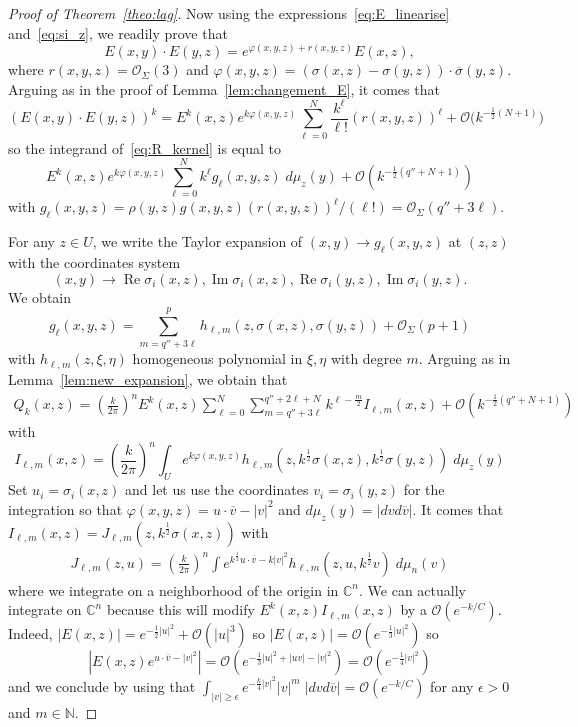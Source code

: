 \documentclass[10pt,a4paper]{article}
\theoremstyle{definition}
\numberwithin{equation}{section}
\newcommand{\N}{{\mathbb{N}}}
\newcommand{\C}{{\mathbb{C}}}
\newcommand{\si}{{\sigma}}
\newcommand{\Si}{{\Sigma}}
\newcommand{\ep}{\epsilon}
\newcommand{\con}{\overline}
\newcommand{\op}{\operatorname}
\newcommand{\bigo}{\mathcal{O}}
\begin{document}
\begin{proof}[Proof of Theorem~\ref{theo:lag}]
Now using the expressions~\eqref{eq:E_linearise} and~\eqref{eq:si_z}, we readily prove that
\[
E(x,y) \cdot E(y,z) = e^{ \varphi (x,y,z) + r(x,y,z) } E
(x,z),
\]
where $r(x,y,z) = \bigo_{\Si} (3)$ and $ \varphi(x,y,z) = (\si (x,z) - \si (y,z))\cdot \con{\si} (y,z) $. Arguing as in the proof of Lemma~\ref{lem:changement_E}, it comes that
\[
(E(x,y) \cdot E(y,z))^k = E^k(x,z) e^{k \varphi (x,y,z)} \sum_{\ell =0 }^{N}
\frac{k^{\ell}}{\ell !} (r (x,y,z))^{\ell} + \bigo \bigl(k^{-\frac{1}{2} (N+1) } \bigr)
\]
so the integrand of~\eqref{eq:R_kernel} is equal to
\[
E^k(x,z) e^{k \varphi (x,y,z)} \sum_{\ell =0 }^{N}
k^{\ell} g_{\ell} (x,y,z) \; d\mu_z (y) + \bigo \left(k^{-\frac{1}{2} (q'' + N+1)} \right)
\]
with $g_{\ell} (x,y,z) = \rho(y,z) g (x,y,z) (r (x,y,z)) ^\ell / (\ell !) = \bigo_{\Si} (q''+ 3\ell)$.

For any $z \in U$, we write the Taylor expansion of $(x,y) \rightarrow g_{\ell}(x, y,z)$ at $(z,z)$ with the coordinates system
\[
(x,y) \rightarrow \op{Re} \si_i (x,z), \op{Im} \si_i (x,z),
\op{Re} \si_i (y,z), \op{Im} \si_i (y,z).
\]
We obtain
\[
g_\ell(x,y,z) = \sum_{m= q'' + 3 \ell}^{p} h_{\ell,m} (z, \si (x,z), \si (y,z))
+ \bigo_{\Si} (p+1)
\]
with $h_{\ell,m} (z, \xi, \eta)$ homogeneous polynomial in $\xi, \eta$ with degree $m$. Arguing as in Lemma~\ref{lem:new_expansion}, we obtain that
\begin{gather}\label{eq:dev_loc_R}
Q_k (x,z) = \left(\frac{k}{2\pi} \right)^n E^k(x,z) \sum_{\ell= 0}^{N}
\sum_{m= q''+ 3 \ell}^{q''+ 2 \ell +N} k^{\ell - \frac{m}{2}} I_{\ell,m} (x,z) + \bigo \left(k^{-\frac{1}{2} \left(q'' + N+1\right)} \right)
\end{gather}
with
\[
I_{\ell,m} (x,z) = \left(\frac{k}{2\pi} \right)^n \int_U e^{k
\varphi (x,y,z) } h_{\ell,m} \left(z, k^{\frac{1}{2}} \si (x,z), k^{\frac{1}{2}}
\si (y,z)\right) \; d\mu_z (y)
\]
Set $u_i = \si_i (x,z)$ and let us use the coordinates $v_i = \si_i (y,z)$ for the integration so that $\varphi (x,y,z) = u \cdot \con v - |v|^2$ and $d\mu_z (y) = |dv d \con{v}|$. It comes that $ I_{\ell, m} (x,z) = J_{\ell, m} (z, k^{\frac{1}{2}} \si (x,z))$ with
\begin{gather}\label{eq:j_ell_m}
J_{\ell, m } (z, u) = \left(\frac{k}{2\pi} \right)^n \int e^{ k^{\frac{1}{2}} u \cdot \con v - k |v|^2} h_{\ell,m} \left(z, u, k^{\frac{1}{2} } v\right) \; d \mu_n (v)
\end{gather}
where we integrate on a neighborhood of the origin in $\C^n$. We can actually integrate on $\C^n$ because this will modify $E^k(x,z) I_{\ell,m} (x,z)$ by a $\bigo (e^{-k/C})$. Indeed, $| E(x,z) | = e^{-\frac{1}{2} |u|^2} + \bigo (|u|^3)$ so $|E(x,z) | = \bigo (e^{-\frac{1}{3} |u|^2})$ so
\[
\left|E(x,z) e^{u
\cdot \con v - |v|^2}\right| = \bigo \left(e^{ - \frac{1}{3} |u|^2 + |uv| - |v|^2 }\right) = \bigo \left(
e^{ -\frac{1}{4} |v| ^2}\right)
\]
and we conclude by using that $ \int_{|v|\geqslant \epsilon} e^{- \frac{k}{4} |v|^2} |v|^m \; |dv d
\con{v}| = \bigo (e^{-k/C})$ for any $\ep >0$ and $m \in \N$.


\end{proof}
\end{document}
